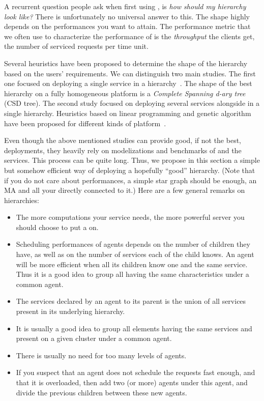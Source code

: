 A recurrent question people ask when first using \diet, is \emph{how should my
  hierarchy look like?} There is unfortunately no universal answer to
this. The shape highly depends on the performances you want \diet to
attain. The performance metric that we often use to characterize the
performance of \diet is the \emph{throughput} the clients get, \ie the number
of serviced requests per time unit. 

Several heuristics have been proposed to determine the shape of the hierarchy
based on the users' requirements. We can distinguish two main studies. The
first one focused on deploying a single service in a \diet
hierarchy~\cite{InProceedingsCaron.CCD_08,InProceedingsCaron.CCL_04}. The shape
of the best hierarchy on a fully homogeneous platform is a \emph{Complete
Spanning d-ary tree} (CSD tree). The second study focused on deploying several
services alongside in a single hierarchy. Heuristics based on linear
programming and genetic algorithm have been proposed for different kinds of
platform~\cite{CARON:2010:INRIA-00490406:1,CARON:2010:INRIA-00456045:3}.

Even though the above mentioned studies can provide good, if not the best,
deployments, they heavily rely on modelizations and benchmarks of \diet and the
services. This process can be quite long. Thus, we propose in this section a
simple but somehow efficient way of deploying a hopefully ``good'' hierarchy.
(Note that if you do not care about performances, a simple star
graph should be enough, \ie an MA and all your \seds directly connected to it.)
Here are a few general remarks on \diet hierarchies:
\begin{itemize}
\item The more computations your service needs, the more powerful server you
  should choose to put a \sed on.
\item Scheduling performances of agents depends on the number of children they
  have, as well as on the number of services each of the child knows. An agent
  will be more efficient when all its children know one and the same
  service. Thus it is a good idea to group all \seds having the same
  characteristics under a common agent.
\item The services declared by an agent to its parent is the union of all
  services present in its underlying hierarchy.
\item It is usually a good idea to group all \diet elements having the same
  services and present on a given cluster under a common agent.
\item There is usually no need for too many levels of agents.
\item If you suspect that an agent does not schedule the requests fast enough,
  and that it is overloaded, then add two (or more) agents under this agent,
  and divide the previous children between these new agents.
\end{itemize}



